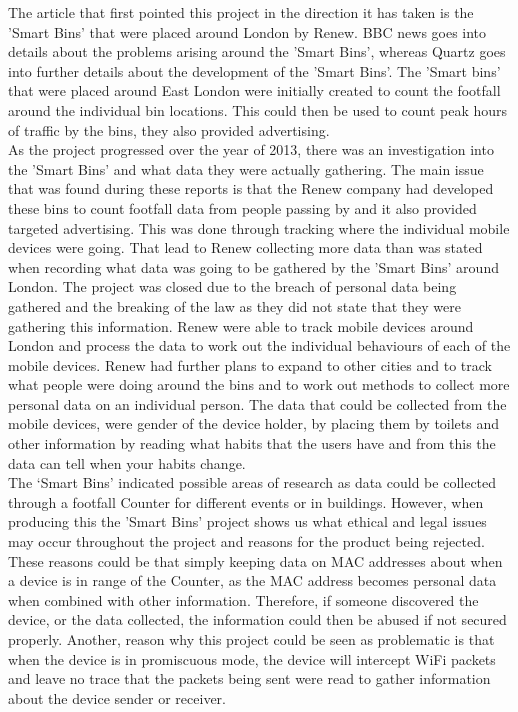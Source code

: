 \documentclass{report}
\begin{document}
The article that first pointed this project in the direction it has taken is the 'Smart Bins' that were placed around London by Renew. BBC news goes into details about the problems arising around the 'Smart Bins'\cite{Smart_bins}, whereas Quartz goes into further details about the development of the 'Smart Bins'\cite{SmartBins2}. The 'Smart bins' that were placed around East London were initially created to count the footfall around the individual bin locations. This could then be used to count peak hours of traffic by the bins, they also provided advertising.\\ \newline
As the project progressed over the year of 2013, there was an investigation into the 'Smart Bins' and what data they were actually gathering. The main issue that was found during these reports is that the Renew company had developed these bins to count footfall data from people passing by and it also provided targeted advertising. This was done through tracking where the individual mobile devices were going. That lead to Renew collecting more data than was stated when recording what data was going to be gathered by the 'Smart Bins' around London. The project was closed due to the breach of personal data being gathered and the breaking of the law as they did not state that they were gathering this information. Renew were able to track mobile devices around London and process the data to work out the individual behaviours of each of the mobile devices. Renew had further plans to expand to other cities and to track what people were doing around the bins and to work out methods to collect more personal data on an individual person. The data that could be collected from the mobile devices, were gender of the device holder, by placing them by toilets and other information by reading what habits that the users have and from this the data can tell when your habits change.
\\ \newline
The ‘Smart Bins’ indicated possible areas of research as data could be collected through a footfall Counter for different events or in buildings. However, when producing this the 'Smart Bins' project shows us what ethical and legal issues may occur throughout the project and reasons for the product being rejected. These reasons could be that simply keeping data on MAC addresses about when a device is in range of the Counter, as the MAC address becomes personal data when combined with other information. Therefore, if someone discovered the device, or the data collected, the information could then be abused if not secured properly. Another, reason why this project could be seen as problematic is that when the device is in promiscuous mode\cite{Promiscuous_mode}, the device will intercept WiFi packets and leave no trace that the packets being sent were read to gather information about the device sender or receiver. \\ \newline
\end{document}
